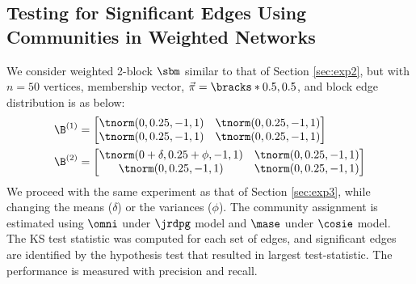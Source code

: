 




\subsection{Testing for Significant Edges Using Communities in Weighted Networks} \label{sec:exp4}

We consider weighted 2-block $\sbm$ similar to that of Section \ref{sec:exp2}, but with $n=50$ vertices, membership vector, $\vec{\pi} = \bracks*{0.5, 0.5}$, and block edge distribution is as below: 
\begin{align*}
    \B^{(1)} &= 
    \begin{bmatrix}
        \tnorm(0, 0.25, -1, 1)   & \tnorm(0, 0.25, -1, 1) \\
        \tnorm(0, 0.25, -1, 1)   & \tnorm(0, 0.25, -1, 1) 
    \end{bmatrix} \\
    \B^{(2)} &= 
    \begin{bmatrix}
        \tnorm(0 + \delta, 0.25 + \phi, -1, 1)   & \tnorm(0, 0.25, -1, 1) \\
        \tnorm(0, 0.25, -1, 1)   & \tnorm(0, 0.25, -1, 1) 
    \end{bmatrix}
\end{align*}
We proceed with the same experiment as that of Section \ref{sec:exp3}, while changing the means ($\delta$) or the variances ($\phi$). The community assignment is estimated using $\omni$ under $\jrdpg$ model and $\mase$ under $\cosie$ model.
The KS test statistic was computed for each set of edges, and significant edges are identified by the hypothesis test that resulted in largest test-statistic.
The performance is measured with precision and recall. 

